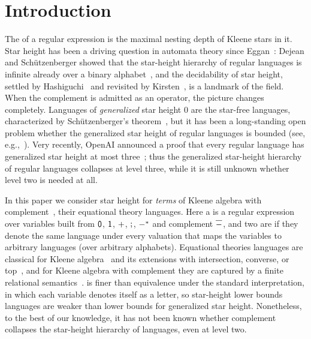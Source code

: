 \section{Introduction}\label{section: introduction}

The  of a regular expression is the maximal nesting depth of Kleene stars in it.
Star height has been a driving question in automata theory since Eggan~\cite{egganTransitionGraphsStarheight1963}:
Dejean and Sch\"utzenberger showed that the star-height hierarchy of regular languages is infinite already over a binary alphabet~\cite{dejeanQuestionEggan1966},
and the decidability of star height, settled by Hashiguchi~\cite{hashiguchiAlgorithmsDeterminingRelative1988} and revisited by Kirsten~\cite{kirstenDistanceDesertAutomata2005}, is a landmark of the field.
When the complement is admitted as an operator, the picture changes completely.
Languages of \emph{generalized} star height $0$ are the star-free languages, characterized by Sch\"utzenberger's theorem~\cite{schutzenbergerFiniteMonoidsHaving1965},
but it has been a long-standing open problem whether the generalized star height of regular languages is bounded (see, e.g.,~\cite{pinResultsGeneralizedStarheight1992}).
Very recently, OpenAI announced a proof that every regular language has generalized star height at most three~\cite{openaiGeneralizedStarHeight2026};
thus the generalized star-height hierarchy of regular languages collapses at level three, while it is still unknown whether level two is needed at all.

In this paper we consider star height for \emph{terms} of Kleene algebra with complement~\cite{nakamuraFiniteRelationalSemantics2025},  their equational theory  languages.
Here a  is a regular expression over variables built from $\mathsf{0}$, $\mathsf{1}$, $\mathbin{+}$, $\mathbin{;}$, ${-}^{*}$ and complement $\overline{{-}}$,
and two  are  if they denote the same language under every valuation that maps the variables to arbitrary languages (over arbitrary alphabets).
Equational theories  languages are classical for Kleene algebra~\cite{kozenCompletenessTheoremKleene1991} and its extensions with intersection, converse, or top~\cite{andrekaEquationalTheoryKleene2011,brunetReversibleKleeneLattices2017,pousCompletenessTheoremsKleene2022},
and for Kleene algebra with complement they are captured by a finite relational semantics~\cite{nakamuraFiniteRelationalSemantics2025}.
 is finer than equivalence under the standard interpretation, in which each variable denotes itself as a letter,
so star-height lower bounds  languages are weaker than lower bounds for generalized star height.
Nonetheless, to the best of our knowledge, it has not been known whether complement collapses the star-height hierarchy of   languages, even at level two.

